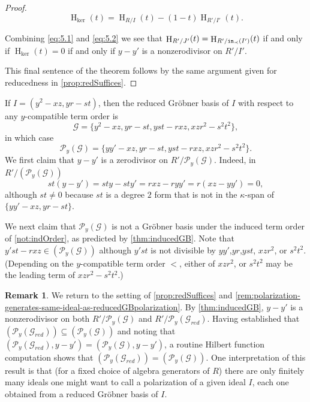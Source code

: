 \documentclass[12pt, reqno]{amsart}
\numberwithin{equation}{section}
\newtheorem{Main Conjecture}[theorem]{Main Conjecture}
\theoremstyle{definition}
\newenvironment{example}
  {\pushQED{\qed}\renewcommand{\qedsymbol}{$\diamondsuit$}\examplex}
  {\popQED\endexamplex}
\newtheorem{remark}[theorem]{Remark}
\theoremstyle{plain}
\newcommand{\init}{{\tt in}}
\newcommand{\G}{\mathcal{G}}
\renewcommand{\P}{\mathcal{P}}
\DeclareMathOperator{\HS}{H}
\begin{document}
\begin{proof}
\begin{equation}\label{eq:5.2}
\HS_{\ker}(t) = \HS_{R/I}(t)-(1-t)\HS_{R'/I'}(t).
\end{equation}


Combining \cref{eq:5.1} and  \cref{eq:5.2} we see that $\HS_{R'/J'}(t)=\HS_{R'/\init_{\prec}(I')}(t)$ if and only if $\HS_{\ker}(t)=0$ if and only if $y-y'$ is a nonzerodivisor on $R'/I'$.

This final sentence of the theorem follows by the same argument given for reducedness in \cref{prop:redSuffices}.
\end{proof}

\begin{example}\label{ex:badGens}
    If $I = (y^2-xz, yr-st)$, then the reduced Gr\"obner basis of $I$ with respect to any $y$-compatible term order is \[
\G = \{y^2-xz,yr-st,yst-rxz,xzr^2-s^2t^2\}, 
    \] in which case \[
\P_y(\G) = \{yy'-xz,yr-st,yst-rxz,xzr^2-s^2t^2\}. 
    \] 
We first claim that $y-y'$ is a zerodivisor on $R'/\P_y(\G)$.  Indeed, in $R'/(\P_y(\G))$ \[
st(y-y') = sty-sty' = rxz-ryy' = r(xz-yy')=0, 
    \] although $st \neq 0$ because $st$ is a degree $2$ form that is not in the $\kappa$-span of $\{yy'-xz,yr-st\}$.

We next claim that $\P_y(\G)$ is not a Gr\"obner basis under the induced term order of \cref{not:indOrder}, as predicted by \cref{thm:inducedGB}. Note that $y'st-rxz \in (\P_y(\G))$ although $y'st$ is not divisible by $yy'$,$yr$,$yst$, $xzr^2$, or $s^2t^2$. (Depending on the $y$-compatible term order $<$, either of $xzr^2$, or $s^2t^2$ may be the leading term of $xzr^2-s^2t^2$.)
\end{example}


\begin{remark}We return to the setting of \cref{prop:redSuffices} and \cref{rem:polarization-generates-same-ideal-as-reducedGBpolarization}.  By \cref{thm:inducedGB}, $y-y'$ is a nonzerodivisor on both $R'/\P_y(\G)$ and $R'/\P_y(\G_{red})$.  Having established that $(\P_y(\G_{red})) \subseteq (\P_y(\G))$ and noting that $(\P_y(\G_{red}), y-y') = (\P_y(\G), y-y')$, a routine Hilbert function computation shows that $(\P_y(\G_{red})) = (\P_y(\G))$.  One interpretation of this result is that (for a fixed choice of algebra generators of $R$) there are only finitely many ideals one might want to call a polarization of a given ideal $I$, each one obtained from a reduced Gr\"obner basis of $I$.
\end{remark}
\end{document}
